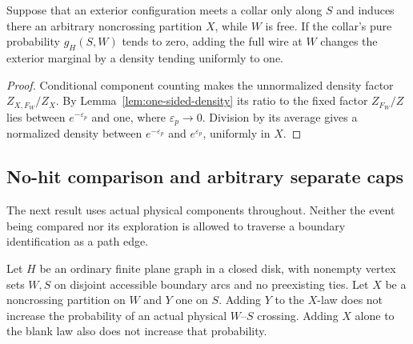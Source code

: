 \begin{corollary}
\label{rect:one-sided-marginal}
Suppose that an exterior configuration meets a collar only along $S$
and induces there an arbitrary noncrossing partition $X$, while $W$
is free.  If the collar's pure probability $g_H(S,W)$ tends to zero,
adding the full wire at $W$ changes the exterior marginal by a density
tending uniformly to one.
\end{corollary}

\begin{proof}
Conditional component counting makes the unnormalized density factor
$Z_{X,F_W}/Z_X$.  By Lemma~\ref{lem:one-sided-density} its ratio to
the fixed factor $Z_{F_W}/Z$ lies between $e^{-\varepsilon_p}$ and
one, where $\varepsilon_p\to0$.  Division by its average gives a
normalized density between $e^{-\varepsilon_p}$ and
$e^{\varepsilon_p}$, uniformly in $X$.
\end{proof}

\subsection{No-hit comparison and arbitrary separate caps}

The next result uses actual physical components throughout.  Neither
the event being compared nor its exploration is allowed to traverse a
boundary identification as a path edge.

\begin{lemma}
\label{lem:no-hit}
Let $H$ be an ordinary finite plane graph in a closed disk, with
nonempty vertex sets $W,S$ on disjoint accessible boundary arcs and
no preexisting ties.  Let $X$ be a noncrossing partition on $W$ and
$Y$ one on $S$.  Adding $Y$ to the $X$-law does not increase the probability
of an actual physical $W$--$S$ crossing.  Adding $X$ alone to the
blank law also does not increase that probability.
\end{lemma}

